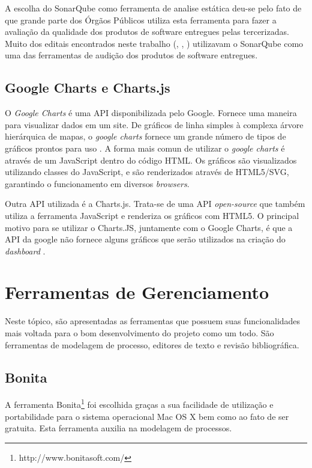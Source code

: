 A escolha do SonarQube como ferramenta de analise estática deu-se pelo fato de que grande parte dos Órgãos Públicos utiliza esta ferramenta para fazer a avaliação da qualidade dos produtos de software entregues pelas tercerizadas. Muito dos editais encontrados neste trabalho (\cite{tiossi_junior_adesao_2010}, \cite{fernandes_licitacao_2005}, \cite{edital})  utilizavam o SonarQube como uma das ferramentas de audição dos produtos de software entregues.
	
	\subsection{Google Charts e Charts.js}
	\label{sub:google_charts_chartsjs}
	O \textit{Google Charts} é uma API disponibilizada pelo Google. Fornece uma maneira para visualizar dados em um site. De gráficos de linha simples à complexa árvore hierárquica de mapas, o \textit{google charts} fornece um grande número de tipos de gráficos prontos para uso \cite{google_charts}. A forma mais comun de utilizar o \textit{google charts} é através de um JavaScript dentro do código HTML. Os gráficos são visualizados utilizando classes do JavaScript, e são renderizados através de HTML5/SVG, garantindo o funcionamento em diversos \textit{browsers}. 

Outra API utilizada é a Charts.js. Trata-se de uma API \textit{open-source} que também utiliza a ferramenta JavaScript e renderiza os gráficos com HTML5. O principal motivo para se utilizar o Charts.JS, juntamente com o Google Charts, é que a API da google não fornece alguns gráficos que serão utilizados na criação do \textit{dashboard} \cite{chartsjs}.
	
\section{Ferramentas de Gerenciamento}
Neste tópico, são apresentadas as ferramentas que possuem suas funcionalidades mais voltada para o bom desenvolvimento do projeto como um todo. São ferramentas de modelagem de processo, editores de texto e revisão bibliográfica. 

	\subsection{Bonita} %
	\label{sub:Bonita}
		 A ferramenta Bonita\footnote{http://www.bonitasoft.com/} foi escolhida graças a sua facilidade de utilização e portabilidade para o sistema operacional Mac OS X bem como ao fato de ser gratuita. Esta ferramenta auxilia na modelagem de processos.

